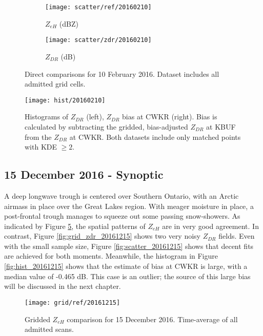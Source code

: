 \begin{figure}[H]
\centering
   \begin{subfigure}{0.49\linewidth} \centering
     \texttt{[image: scatter/ref/20160210]}
     \caption{$Z_{eH}$ (dBZ)}\label{fig:scatter_ref_20160210}
   \end{subfigure}
   \begin{subfigure}{0.49\linewidth} \centering
     \texttt{[image: scatter/zdr/20160210]}
     \caption{$Z_{DR}$ (dB)}\label{fig:scatter_zdr_20160210}
   \end{subfigure}
\caption{Direct comparisons for 10 February 2016. Dataset includes all admitted grid cells.} \label{fig:scatter_20160210}
\end{figure}

\begin{figure}[H]
\texttt{[image: hist/20160210]}\centering
\caption{Histograms of $Z_{DR}$ (left), $Z_{DR}$ bias at CWKR (right). Bias is calculated by subtracting the gridded, bias-adjusted $Z_{DR}$ at KBUF from the
$Z_{DR}$ at CWKR. Both datasets include only matched points with KDE $\geq 2$.} 
\label{fig:hist_20160210}
\end{figure}

\subsection{15 December 2016 - Synoptic}
A deep longwave trough is centered over Southern Ontario, with an Arctic airmass in place over the Great Lakes region. With meager moisture in place, a
post-frontal trough manages to squeeze out some passing snow-showers. As indicated by Figure \ref{fig:grid_ref_20161215}, the spatial patterns of $Z_{eH}$ are in very good agreement. In contrast, Figure \ref{fig:grid_zdr_20161215} shows two very noisy $Z_{DR}$ fields. Even with the small sample size, Figure \ref{fig:scatter_20161215} shows that decent fits are achieved for both moments. Meanwhile, the histogram in Figure \ref{fig:hist_20161215} shows that the estimate of bias at CWKR is large, with a median value of -0.465 dB. This case is an outlier; the source of this large bias will be discussed in the next chapter. 
\begin{figure}[p]
\texttt{[image: grid/ref/20161215]}
\caption{Gridded $Z_{eH}$ comparison for 15 December 2016. Time-average of all admitted scans.} 
\label{fig:grid_ref_20161215}
\end{figure}

